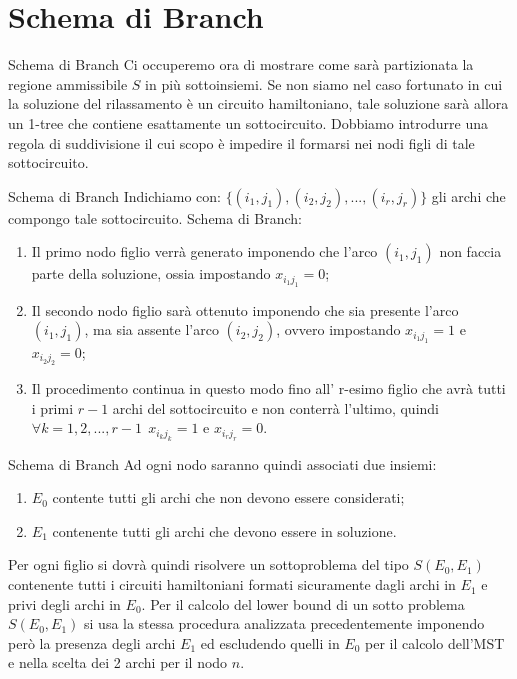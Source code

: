 \documentclass[10pt]{beamer}
\begin{document}
\section{Schema di Branch}
\begin{frame}{Schema di Branch}
    Ci occuperemo ora di mostrare come sarà partizionata la regione ammissibile $S$ in più sottoinsiemi. Se non siamo nel caso fortunato in cui la soluzione del rilassamento è un circuito hamiltoniano, tale soluzione sarà allora un 1-tree che contiene esattamente un sottocircuito. Dobbiamo introdurre una regola di suddivisione il cui scopo è impedire il formarsi nei nodi figli di tale sottocircuito.
\end{frame}

\begin{frame}{Schema di Branch}
    Indichiamo con: $\{(i_1, j_1), (i_2,j_2),...,(i_r,j_r)\}$ gli archi che compongo tale sottocircuito.
    \newline
    \newline
    Schema di Branch:
    \begin{enumerate}
        \item  Il primo nodo figlio verrà generato imponendo che l'arco $(i_1,j_1)$ non faccia parte della soluzione, ossia impostando $x_{i_{1}j_{1}} = 0$;
        \item Il secondo nodo figlio sarà ottenuto imponendo che sia presente l'arco $(i_1,j_1)$, ma sia assente l'arco $(i_2,j_2)$, ovvero impostando $x_{i_{1}j_{1}} = 1$ e $x_{i_{2}j_{2}} = 0$;
        \item Il procedimento continua in questo modo fino all' r-esimo figlio che avrà tutti i primi $r-1$ archi del sottocircuito e non conterrà l'ultimo, quindi $\forall k = 1,2,...,r-1 \:\:x_{i_{k}j_{k}} = 1$ e $x_{i_{r}j_{r}} = 0$.
    \end{enumerate}
     
\end{frame}

\begin{frame}{Schema di Branch}
    Ad ogni nodo saranno quindi associati due insiemi: 
    \begin{enumerate}
        \item $E_0$ contente tutti gli archi che non devono essere considerati;
        \item $E_1$ contenente tutti gli archi che devono essere in soluzione.
    \end{enumerate}
    Per ogni figlio si dovrà quindi risolvere un sottoproblema del tipo $S(E_0, E_1)$ contenente tutti i circuiti hamiltoniani formati sicuramente dagli archi in $E_1$ e privi degli archi in $E_0$.
    \newline
    \newline
    Per il calcolo del lower bound di un sotto problema $S(E_0, E_1)$ si usa la stessa procedura analizzata precedentemente imponendo però la presenza degli archi $E_1$ ed escludendo quelli in $E_0$ per il calcolo dell'MST e nella scelta dei 2 archi per il nodo $n$.
\end{frame}
\end{document}
